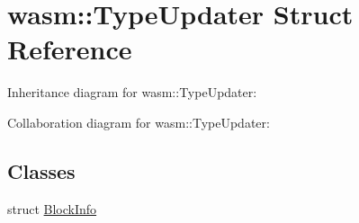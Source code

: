 \hypertarget{structwasm_1_1_type_updater}{}\section{wasm\+:\+:Type\+Updater Struct Reference}
\label{structwasm_1_1_type_updater}


Inheritance diagram for wasm\+:\+:Type\+Updater\+:


Collaboration diagram for wasm\+:\+:Type\+Updater\+:
\subsection*{Classes}
\begin{DoxyCompactItemize}
\item 
struct \mbox{\hyperlink{structwasm_1_1_type_updater_1_1_block_info}{Block\+Info}}
\end{DoxyCompactItemize}
